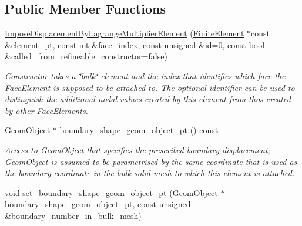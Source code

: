 \subsection*{Public Member Functions}
\begin{DoxyCompactItemize}
\item 
\hyperlink{classoomph_1_1ImposeDisplacementByLagrangeMultiplierElement_aceac32bea480d5da84d225c023bf724c}{Impose\+Displacement\+By\+Lagrange\+Multiplier\+Element} (\hyperlink{classoomph_1_1FiniteElement}{Finite\+Element} $\ast$const \&element\+\_\+pt, const int \&\hyperlink{classoomph_1_1FaceElement_a478d577ac6db67ecc80f1f02ae3ab170}{face\+\_\+index}, const unsigned \&id=0, const bool \&called\+\_\+from\+\_\+refineable\+\_\+constructor=false)
\begin{DoxyCompactList}\small\item\em Constructor takes a \char`\"{}bulk\char`\"{} element and the index that identifies which face the \hyperlink{classoomph_1_1FaceElement}{Face\+Element} is supposed to be attached to. The optional identifier can be used to distinguish the additional nodal values created by this element from thos created by other Face\+Elements. \end{DoxyCompactList}\item 
\hyperlink{classoomph_1_1GeomObject}{Geom\+Object} $\ast$ \hyperlink{classoomph_1_1ImposeDisplacementByLagrangeMultiplierElement_aafddef9b676b780db8f48608f2a8e90d}{boundary\+\_\+shape\+\_\+geom\+\_\+object\+\_\+pt} () const
\begin{DoxyCompactList}\small\item\em Access to \hyperlink{classoomph_1_1GeomObject}{Geom\+Object} that specifies the prescribed boundary displacement; \hyperlink{classoomph_1_1GeomObject}{Geom\+Object} is assumed to be parametrised by the same coordinate that is used as the boundary coordinate in the bulk solid mesh to which this element is attached. \end{DoxyCompactList}\item 
void \hyperlink{classoomph_1_1ImposeDisplacementByLagrangeMultiplierElement_a6efb185b3c2bb21d62cc5df7fccfe56f}{set\+\_\+boundary\+\_\+shape\+\_\+geom\+\_\+object\+\_\+pt} (\hyperlink{classoomph_1_1GeomObject}{Geom\+Object} $\ast$\hyperlink{classoomph_1_1ImposeDisplacementByLagrangeMultiplierElement_aafddef9b676b780db8f48608f2a8e90d}{boundary\+\_\+shape\+\_\+geom\+\_\+object\+\_\+pt}, const unsigned \&\hyperlink{classoomph_1_1FaceElement_a7658b23bf2cf041883f51b827eab9059}{boundary\+\_\+number\+\_\+in\+\_\+bulk\+\_\+mesh})

\end{DoxyCompactItemize}
